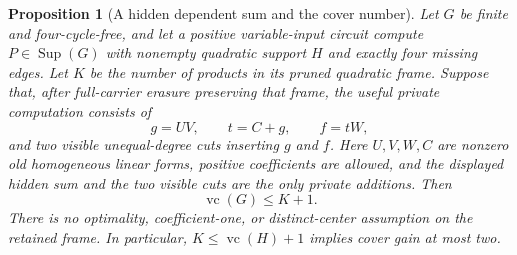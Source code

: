 \documentclass[11pt]{article}
\newcommand{\Sup}{\operatorname{Sup}}
\newcommand{\vc}{\operatorname{vc}}
\newtheorem{proposition}[theorem]{Proposition}
\theoremstyle{definition}
\theoremstyle{remark}
\begin{document}
\begin{proposition}[A hidden dependent sum and the cover number]\label{prop:hiddendependentcover}
Let $G$ be finite and four-cycle-free, and let a positive variable-input circuit compute $P\in\Sup(G)$ with nonempty quadratic support $H$ and exactly four missing edges. Let $K$ be the number of products in its pruned quadratic frame. Suppose that, after full-carrier erasure preserving that frame, the useful private computation consists of
\[
 g=UV,\qquad t=C+g,\qquad f=tW,
\]
and two visible unequal-degree cuts inserting $g$ and $f$. Here $U,V,W,C$ are nonzero old homogeneous linear forms, positive coefficients are allowed, and the displayed hidden sum and the two visible cuts are the only private additions. Then
\[
 \vc(G)\le K+1.
\]
There is no optimality, coefficient-one, or distinct-center assumption on the retained frame. In particular, $K\le\vc(H)+1$ implies cover gain at most two.
\end{proposition}
\end{document}
